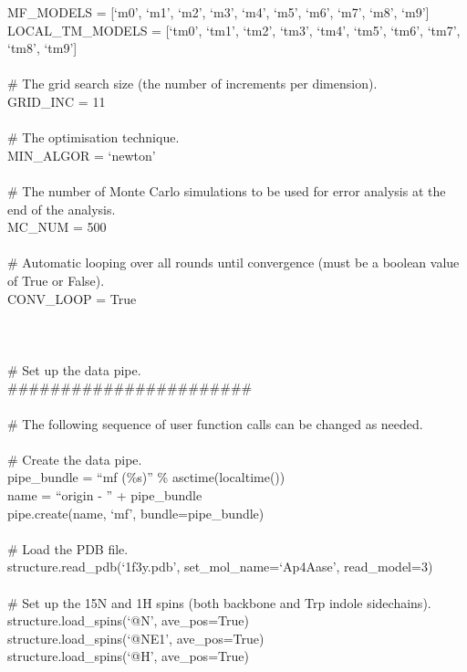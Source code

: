 \begin{htmlonly}
\begin{htmlonly}
\begin{exampleenv}
MF\_MODELS = [`m0', `m1', `m2', `m3', `m4', `m5', `m6', `m7', `m8', `m9'] \\
LOCAL\_TM\_MODELS = [`tm0', `tm1', `tm2', `tm3', `tm4', `tm5', `tm6', `tm7', `tm8', `tm9'] \\
 \\
\# The grid search size (the number of increments per dimension). \\
GRID\_INC = 11 \\
 \\
\# The optimisation technique. \\
MIN\_ALGOR = `newton' \\
 \\
\# The number of Monte Carlo simulations to be used for error analysis at the end of the analysis. \\
MC\_NUM = 500 \\
 \\
\# Automatic looping over all rounds until convergence (must be a boolean value of True or False). \\
CONV\_LOOP = True \\
 \\
 \\
 \\
\# Set up the data pipe. \\
\#\#\#\#\#\#\#\#\#\#\#\#\#\#\#\#\#\#\#\#\#\#\# \\
 \\
\# The following sequence of user function calls can be changed as needed. \\
 \\
\# Create the data pipe. \\
pipe\_bundle = ``mf (\%s)'' \% asctime(localtime()) \\
name = ``origin - '' + pipe\_bundle \\
pipe.create(name, `mf', bundle=pipe\_bundle) \\
 \\
\# Load the PDB file. \\
structure.read\_pdb(`1f3y.pdb', set\_mol\_name=`Ap4Aase', read\_model=3) \\
 \\
\# Set up the 15N and 1H spins (both backbone and Trp indole sidechains). \\
structure.load\_spins(`@N', ave\_pos=True) \\
structure.load\_spins(`@NE1', ave\_pos=True) \\
structure.load\_spins(`@H', ave\_pos=True) \\

\end{exampleenv}
\end{htmlonly}
\end{htmlonly}
